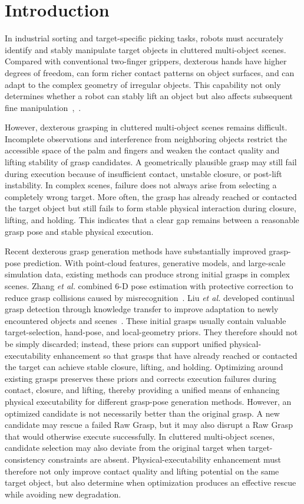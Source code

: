 \documentclass[lettersize,journal]{IEEEtran}
\begin{document}
\section{Introduction}

In industrial sorting and target-specific picking tasks, robots must accurately identify and stably manipulate target objects in cluttered multi-object scenes. Compared with conventional two-finger grippers, dexterous hands have higher degrees of freedom, can form richer contact patterns on object surfaces, and can adapt to the complex geometry of irregular objects. This capability not only determines whether a robot can stably lift an object but also affects subsequent fine manipulation~\cite{ref1},~\cite{ref2}.

However, dexterous grasping in cluttered multi-object scenes remains difficult. Incomplete observations and interference from neighboring objects restrict the accessible space of the palm and fingers and weaken the contact quality and lifting stability of grasp candidates. A geometrically plausible grasp may still fail during execution because of insufficient contact, unstable closure, or post-lift instability. In complex scenes, failure does not always arise from selecting a completely wrong target. More often, the grasp has already reached or contacted the target object but still fails to form stable physical interaction during closure, lifting, and holding. This indicates that a clear gap remains between a reasonable grasp pose and stable physical execution.

Recent dexterous grasp generation methods have substantially improved grasp-pose prediction. With point-cloud features, generative models, and large-scale simulation data, existing methods can produce strong initial grasps in complex scenes. Zhang \emph{et al.} combined 6-D pose estimation with protective correction to reduce grasp collisions caused by misrecognition~\cite{ref3}. Liu \emph{et al.} developed continual grasp detection through knowledge transfer to improve adaptation to newly encountered objects and scenes~\cite{ref4}. These initial grasps usually contain valuable target-selection, hand-pose, and local-geometry priors. They therefore should not be simply discarded; instead, these priors can support unified physical-executability enhancement so that grasps that have already reached or contacted the target can achieve stable closure, lifting, and holding. Optimizing around existing grasps preserves these priors and corrects execution failures during contact, closure, and lifting, thereby providing a unified means of enhancing physical executability for different grasp-pose generation methods. However, an optimized candidate is not necessarily better than the original grasp. A new candidate may rescue a failed Raw Grasp, but it may also disrupt a Raw Grasp that would otherwise execute successfully. In cluttered multi-object scenes, candidate selection may also deviate from the original target when target-consistency constraints are absent. Physical-executability enhancement must therefore not only improve contact quality and lifting potential on the same target object, but also determine when optimization produces an effective rescue while avoiding new degradation.
\end{document}
